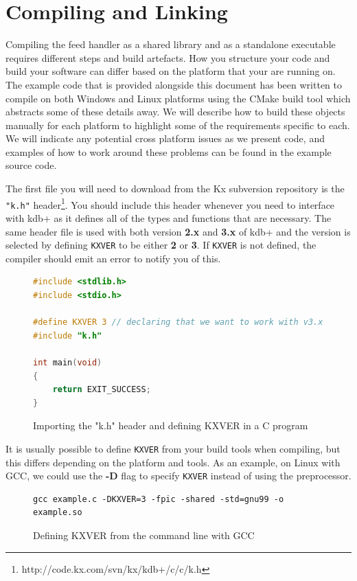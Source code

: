 \chapter{Compiling and Linking}

Compiling the feed handler as a shared library and as a standalone executable requires different
steps and build artefacts. How you structure your code and build your software can differ based
on the platform that your are running on. The example code that is provided alongside this document
has been written to compile on both Windows and Linux platforms using the CMake build tool which
abstracts some of these details away. We will describe how to build these objects manually for
each platform to highlight some of the requirements specific to each. We will indicate any potential
cross platform issues as we present code, and examples of how to work around these problems can be
found in the example source code.

The first file you will need to download from the Kx subversion repository is the \verb|"k.h"| 
header\footnote{http://code.kx.com/svn/kx/kdb+/c/c/k.h}. You should include this header whenever you
need to interface with kdb+ as it defines all of the types and functions that are necessary. The same
header file is used with both version \textbf{2.x} and \textbf{3.x} of kdb+ and the version is selected
by defining \verb|KXVER| to be either \textbf{2} or \textbf{3}. If \verb|KXVER| is not defined, the
compiler should emit an error to notify you of this.

\begin{figure}[h]
\begin{lstlisting}[language=C]
#include <stdlib.h>
#include <stdio.h>

#define KXVER 3 // declaring that we want to work with v3.x of kdb+
#include "k.h"

int main(void)
{
	return EXIT_SUCCESS;
}
\end{lstlisting}
\caption{Importing the "k.h" header and defining KXVER in a C program}
\end{figure}

It is usually possible to define \verb|KXVER| from your build tools when compiling, but this differs
depending on the platform and tools. As an example, on Linux with GCC, we could use the \textbf{-D} flag
to specify \verb|KXVER| instead of using the preprocessor.

\begin{figure}[h]
\begin{lstlisting}
gcc example.c -DKXVER=3 -fpic -shared -std=gnu99 -o example.so
\end{lstlisting}
\caption{Defining KXVER from the command line with GCC}
\end{figure}

